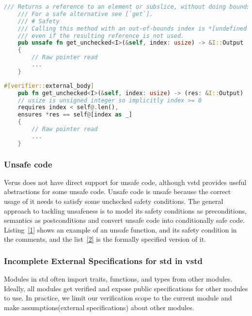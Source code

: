 \documentclass[conference]{IEEEtran}
\begin{document}
\begin{lstlisting}[float,language=Rust,style=colouredRust, caption={a simplified example of the safety condition of an unsafe public function in std}, label = {1}]
     /// Returns a reference to an element or subslice, without doing bounds checking.
    /// For a safe alternative see [`get`].
    /// # Safety
    /// Calling this method with an out-of-bounds index is *[undefined behavior]*
    /// even if the resulting reference is not used.
    pub unsafe fn get_unchecked<I>(&self, index: usize) -> &I::Output
    {
        // Raw pointer read  
        ...
    }
\end{lstlisting}

\begin{lstlisting}[float,language=Rust,style=colouredRust, caption={a simplified example of converting an unsafe function into a conditionally safe function. We do not need the \texttt{unsafe} keyword in the function signature if the caller is also verified. The \texttt{external\_body} annotation makes the verifier ignore the function body. The safety condition in the comment is also replaced with a precondition. The \texttt{@} operator is a syntactic sugar that returns the abstract representation of the operand.}, label = {2}]
    #[verifier::external_body]
    pub fn get_unchecked<I>(&self, index: usize) -> (res: &I::Output)
    // usize is unsigned integer so implicitly index >= 0
    requires index < self@.len(),
    ensures *res == self@[index as _]
    {
        // Raw pointer read  
        ...
    }
\end{lstlisting}
\subsubsection{Unsafe code}
Verus does not have direct support for unsafe code, although vstd provides useful abstractions for some unsafe code. Unsafe code is unsafe because the correct usage of it needs to satisfy some unchecked safety conditions. The general approach to tackling unsafeness is to model its safety conditions as preconditions, semantics as postconditions and convert unsafe code into conditionally safe code. Listing~\ref{1} shows an example of an unsafe function, and its safety condition in the comments, and the list~\ref{2} is the formally specified version of it.   

\subsubsection{Incomplete External Specifications for std in vstd}
Modules in std often import traits, functions, and types from other modules. Ideally, all modules get verified and expose public specifications for other modules to use. In practice, we limit our verification scope to the current module and make assumptions(external specifications) about other modules. 
\end{document}
